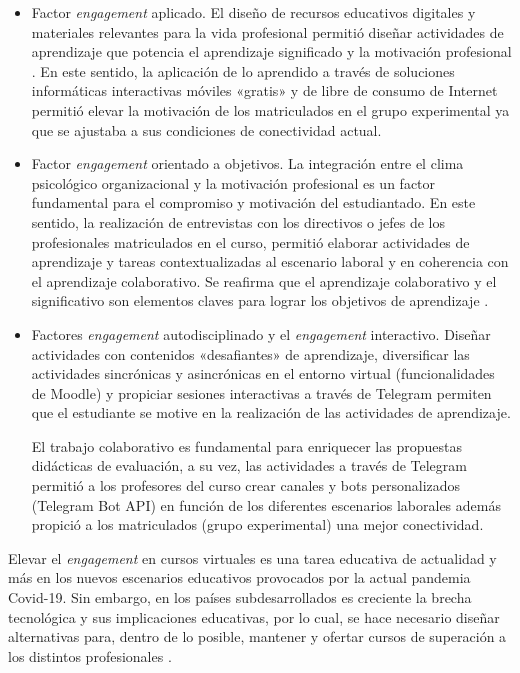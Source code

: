 \documentclass{textolivre}
\begin{document}
\begin{itemize}
    \item Factor \emph{engagement} aplicado. El diseño de recursos educativos digitales y materiales relevantes para la vida profesional permitió diseñar actividades de aprendizaje que potencia el aprendizaje significado y la motivación profesional \cite{amaya2021}. %
    En este sentido, la aplicación de lo aprendido \cite{brown2017} %
    a través de soluciones informáticas interactivas móviles «gratis» y de libre de consumo de Internet permitió elevar la motivación de los matriculados en el grupo experimental ya que se ajustaba a sus condiciones de conectividad actual.
    
    \item Factor \emph{engagement} orientado a objetivos. La integración entre el clima psicológico organizacional y la motivación profesional es un factor fundamental para el compromiso y motivación del estudiantado. En este sentido, la realización de entrevistas con los directivos o jefes de los profesionales matriculados en el curso, permitió elaborar actividades de aprendizaje y tareas contextualizadas al escenario laboral y en coherencia con el aprendizaje colaborativo. Se reafirma que el aprendizaje colaborativo y el significativo son elementos claves para lograr los objetivos de aprendizaje \cite{cardona2015, li2020}. %
    
    \item Factores \emph{engagement} autodisciplinado y el \emph{engagement} interactivo. Diseñar actividades con contenidos «desafiantes» de aprendizaje, diversificar las actividades sincrónicas y asincrónicas en el entorno virtual (funcionalidades de Moodle) y propiciar sesiones interactivas a través de Telegram permiten que el estudiante se motive en la realización de las actividades de aprendizaje.
   
    El trabajo colaborativo \cite{cavinato2021} %
    es fundamental para enriquecer las propuestas didácticas de evaluación, a su vez, las actividades a través de Telegram permitió a los profesores del curso crear canales y bots personalizados (Telegram Bot API) en función de los diferentes escenarios laborales además propició a los matriculados (grupo experimental) una mejor conectividad.
\end{itemize} 

Elevar el \emph{engagement} en cursos virtuales es una tarea educativa de actualidad y más en los nuevos escenarios educativos provocados por la actual pandemia Covid-19. Sin embargo, en los países subdesarrollados es creciente la brecha tecnológica y sus implicaciones educativas, por lo cual, se hace necesario diseñar alternativas para, dentro de lo posible, mantener y ofertar cursos de superación a los distintos profesionales \cite{gonzalez2020, mahdy2020, ojeda2020, santiagoiglesias2021}. %
\end{document}
